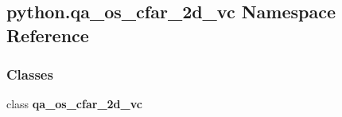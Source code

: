 \subsection{python.\+qa\+\_\+os\+\_\+cfar\+\_\+2d\+\_\+vc Namespace Reference}
\label{namespacepython_1_1qa__os__cfar__2d__vc}
\subsubsection*{Classes}
\begin{DoxyCompactItemize}
\item 
class {\bf qa\+\_\+os\+\_\+cfar\+\_\+2d\+\_\+vc}
\end{DoxyCompactItemize}
